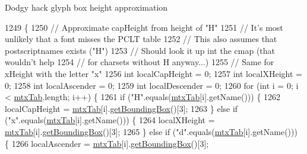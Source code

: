 Dodgy hack glyph box height approximation 
\begin{DoxyCode}
1249                                                      \{
1250         \textcolor{comment}{// Approximate capHeight from height of "H"}
1251         \textcolor{comment}{// It's most unlikely that a font misses the PCLT table}
1252         \textcolor{comment}{// This also assumes that postscriptnames exists ("H")}
1253         \textcolor{comment}{// Should look it up int the cmap (that wouldn't help}
1254         \textcolor{comment}{// for charsets without H anyway...)}
1255         \textcolor{comment}{// Same for xHeight with the letter "x"}
1256         \textcolor{keywordtype}{int} localCapHeight = 0;
1257         \textcolor{keywordtype}{int} localXHeight = 0;
1258         \textcolor{keywordtype}{int} localAscender = 0;
1259         \textcolor{keywordtype}{int} localDescender = 0;
1260         \textcolor{keywordflow}{for} (\textcolor{keywordtype}{int} i = 0; i < \mbox{\hyperlink{classorg_1_1newdawn_1_1slick_1_1tools_1_1hiero_1_1truetype_1_1_t_t_f_file_ad78a13682e242fc4a0b5d34a8e5807fa}{mtxTab}}.length; i++) \{
1261             \textcolor{keywordflow}{if} (\textcolor{stringliteral}{"H"}.equals(\mbox{\hyperlink{classorg_1_1newdawn_1_1slick_1_1tools_1_1hiero_1_1truetype_1_1_t_t_f_file_ad78a13682e242fc4a0b5d34a8e5807fa}{mtxTab}}[i].getName())) \{
1262                 localCapHeight = \mbox{\hyperlink{classorg_1_1newdawn_1_1slick_1_1tools_1_1hiero_1_1truetype_1_1_t_t_f_file_ad78a13682e242fc4a0b5d34a8e5807fa}{mtxTab}}[i].\mbox{\hyperlink{classorg_1_1newdawn_1_1slick_1_1tools_1_1hiero_1_1truetype_1_1_t_t_f_mtx_entry_ad9549a7740d3eb24d72c6351b047e3aa}{getBoundingBox}}()[3];
1263             \} \textcolor{keywordflow}{else} \textcolor{keywordflow}{if} (\textcolor{stringliteral}{"x"}.equals(\mbox{\hyperlink{classorg_1_1newdawn_1_1slick_1_1tools_1_1hiero_1_1truetype_1_1_t_t_f_file_ad78a13682e242fc4a0b5d34a8e5807fa}{mtxTab}}[i].getName())) \{
1264                 localXHeight = \mbox{\hyperlink{classorg_1_1newdawn_1_1slick_1_1tools_1_1hiero_1_1truetype_1_1_t_t_f_file_ad78a13682e242fc4a0b5d34a8e5807fa}{mtxTab}}[i].\mbox{\hyperlink{classorg_1_1newdawn_1_1slick_1_1tools_1_1hiero_1_1truetype_1_1_t_t_f_mtx_entry_ad9549a7740d3eb24d72c6351b047e3aa}{getBoundingBox}}()[3];
1265             \} \textcolor{keywordflow}{else} \textcolor{keywordflow}{if} (\textcolor{stringliteral}{"d"}.equals(\mbox{\hyperlink{classorg_1_1newdawn_1_1slick_1_1tools_1_1hiero_1_1truetype_1_1_t_t_f_file_ad78a13682e242fc4a0b5d34a8e5807fa}{mtxTab}}[i].getName())) \{
1266                 localAscender = \mbox{\hyperlink{classorg_1_1newdawn_1_1slick_1_1tools_1_1hiero_1_1truetype_1_1_t_t_f_file_ad78a13682e242fc4a0b5d34a8e5807fa}{mtxTab}}[i].\mbox{\hyperlink{classorg_1_1newdawn_1_1slick_1_1tools_1_1hiero_1_1truetype_1_1_t_t_f_mtx_entry_ad9549a7740d3eb24d72c6351b047e3aa}{getBoundingBox}}()[3];

\end{DoxyCode}
